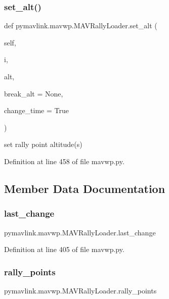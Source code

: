 \subsubsection{\texorpdfstring{set\_alt()}{set\_alt()}}
{\footnotesize\ttfamily def pymavlink.\+mavwp.\+M\+A\+V\+Rally\+Loader.\+set\+\_\+alt (\begin{DoxyParamCaption}\item[{}]{self,  }\item[{}]{i,  }\item[{}]{alt,  }\item[{}]{break\+\_\+alt = {\ttfamily None},  }\item[{}]{change\+\_\+time = {\ttfamily True} }\end{DoxyParamCaption})}

\begin{DoxyVerb}set rally point altitude(s)\end{DoxyVerb}
 

Definition at line 458 of file mavwp.\+py.



\subsection{Member Data Documentation}
\mbox{\label{classpymavlink_1_1mavwp_1_1MAVRallyLoader_a53cd4202f793f51f8f7cb23ee72920c2}} 
\subsubsection{\texorpdfstring{last\_change}{last\_change}}
{\footnotesize\ttfamily pymavlink.\+mavwp.\+M\+A\+V\+Rally\+Loader.\+last\+\_\+change}



Definition at line 405 of file mavwp.\+py.

\mbox{\label{classpymavlink_1_1mavwp_1_1MAVRallyLoader_a6d0257a0bbbf63a02933bbedeb8ba614}} 
\subsubsection{\texorpdfstring{rally\_points}{rally\_points}}
{\footnotesize\ttfamily pymavlink.\+mavwp.\+M\+A\+V\+Rally\+Loader.\+rally\+\_\+points}



